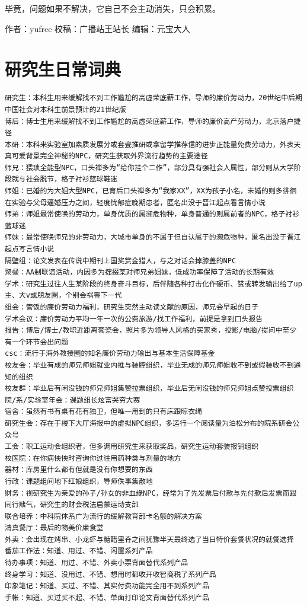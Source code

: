 \documentclass[
]{book}
\begin{document}
毕竟，问题如果不解决，它自己不会主动消失，只会积累。

作者：yufree
校稿：广播站王站长
编辑：元宝大人

\hypertarget{ux7814ux7a76ux751fux65e5ux5e38ux8bcdux5178}{%
\section{研究生日常词典}\label{ux7814ux7a76ux751fux65e5ux5e38ux8bcdux5178}}

\begin{verbatim}
研究生：本科生用来缓解找不到工作尴尬的高虚荣底薪工作，导师的廉价劳动力，20世纪中后期中国社会对本科生前景预计的21世纪版
博后：博士生用来缓解找不到工作尴尬的高虚荣底薪工作，导师的廉价高产劳动力，北京落户捷径
本研：本科来实验室加素质发展分或套瓷推研或拿留学推荐信的进步正能量免费劳动力，外表天真可爱背景完全神秘的NPC，研究生获取外界流行趋势的主要途径
师兄：猥琐全能型NPC，口头禅多为“给你挂个二作”，部分具有强社会人属性，部分则从大学阶段就与社会脱节，格子衬衫蓝球鞋迷
师姐：已婚的为大姐大型NPC，已育后口头禅多为“我家XX”，XX为孩子小名，未婚的则多徘徊在实验与父母逼婚压力之间，轻度忧郁症晚期患者，匿名出没于晋江起点看言情小说
师弟：师姐最常使唤的劳动力，单身优质的属濒危物种，单身普通的则属前者的NPC，格子衬衫蓝球迷
师妹：最常使唤师兄的非劳动力，大城市单身的不属于但自认属于的濒危物种，匿名出没于晋江起点写言情小说
隔壁组：论文发表在传说中期刊上国奖赏金猎人，与之对话会掉膝盖的NPC
聚餐：AA制联谊活动，内因多为撺掇某对师兄弟姐妹，低成功率保障了活动的长期有效
学术：研究生过往人生某阶段的终身奋斗目标，后伴随各种打击化作硬币、赞或转发输出给了up主、大v或朋友圈，个别会祸害下一代
组会：管饭的廉价劳动力福利，研究生突然主动读文献的原因，师兄会早起的日子
学术会议：廉价劳动力平均一年一次的公费旅游/找工作福利，前提是拿到口头报告
报告：博后/博士/教职近距离套瓷会，照片多为领导人风格的买家秀，投影/电脑/提问中至少有一个环节会出问题
csc：流行于海外教授圈的知名廉价劳动力输出与基本生活保障基金
校友会：毕业有成的师兄师姐就业内推与装腔组织，毕业无成的师兄师姐收不到或假装收不到通知的组织
校友群：毕业后有闲没钱的师兄师姐集赞拉票组织，毕业后无闲没钱的师兄师姐点赞投票组织
院/系/实验室年会：课题组长炫富哭穷大赛
宿舍：虽然有书有桌有花有独卫，但唯一用到的只有床跟晾衣绳
研究生会：存在于楼下大厅海报中的虚拟NPC组织，多运行一个阅读量为泊松分布的院系研会公众号
工会：职工运动会组织者，但多调用研究生来获取奖品，研究生运动套装报销组织
校医院：在你病怏怏时咨询你过往用药种类与剂量的地方
器材：库房里什么都有但就是没有你想要的东西
行政：课题组间地下红娘组织，导师佚事集散地
财务：视研究生为亲爱的孙子/孙女的非血缘NPC，经常为了先发票后付款与先付款后发票而跟同行赌气，研究生的财会税法启蒙运动支部
联合培养：中科院体系广为流行的缓解教育部卡名额的解决方案
清真餐厅：最后的物美价廉食堂
外卖：会出现在烤串、小龙虾与糖醋里脊之间犹豫半天最终选了当日特价套餐状况的就餐选择
番茄工作法：知道、用过、不错、闲置系列产品
待办事项：知道、用过、不错、外卖小票背面替代系列产品
终身学习：知道、没用过、不错、想用时都收开收智商税了系列产品
印象笔记：知道、买过、不错、其实付费功能完全用不到系列产品
手帐：知道、买过买不起、不错、单面打印论文背面替代系列产品


\end{verbatim}
\end{document}
